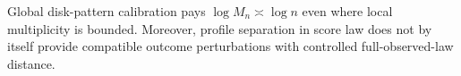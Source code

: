Global disk-pattern calibration pays \(\log M_n\asymp\log n\) even where local multiplicity is bounded. Moreover, profile separation in score law does not by itself provide compatible outcome perturbations with controlled full-observed-law distance.